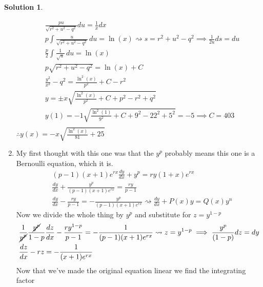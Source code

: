 \documentclass[10pt]{article}
\theoremstyle{definition}
\newtheorem{soln}{Solution}
\begin{document}
\begin{soln}
\begin{enumerate}[label=(\alph*)]
\begin{align*}
             & \frac{pu}{\sqrt{r^2+u^2-q^2}}du=\frac{1}{x}dx                                                           \\
             & p\int \frac{u}{\sqrt{r^2+u^2-q^2}} \, du=\ln(x)\rightsquigarrow s=r^2+u^2-q^2\implies \frac{1}{2u}ds=du \\
             & \frac{p}{2}\int \frac{1}{\sqrt{u}} \, du=\ln(x)                                                         \\
             & p\sqrt{r^2+u^2-q^2}=\ln(x)+C                                                                            \\
             & \frac{y^2}{x^2}-q^2=\frac{\ln^2(x)}{p^2}+C-r^2                                                          \\
             & y=\pm x\sqrt{\frac{\ln^2(x)}{p^2}+C+p^2-r^2+q^2}                                                        \\
             & y(1)=-1\sqrt{\frac{\ln^2(1)}{9^2}+C+9^2-22^2+5^2} = -5\implies C=403                                    \\
          \end{align*}
          $\therefore y(x)=-x\sqrt{\frac{\ln^2(x)}{81}+25}$
          \newpage
    \item My first thought with this one was that the $y^p$ probably means this one is a Bernoulli equation, which it is.
          \begin{align*}
             & (p-1)(x+1)e^{rx}\frac{dy}{dx}+y^p=ry(1+x)e^{rx}                                                                       \\
             & \frac{dy}{dx}+\frac{y^p}{(p-1)(x+1)e^{rx}}=\frac{ry}{p-1}                                                             \\
             & \frac{dy}{dx}-\frac{ry}{p-1}=-\frac{y^p}{(p-1)(x+1)e^{rx}} \rightsquigarrow\displaystyle \frac{dy}{dx}+P(x)y=Q(x)y^n
          \end{align*}
          Now we divide the whole thing by $y^p$ and substitute for $z=y^{1-p}$
          \begin{align*}
             & \frac{1}{\cancel{y^p}}\frac{\cancel{y^p}}{1-p}\frac{dz}{dx}-\frac{ry^{1-p}}{p-1}=-\frac{1}{(p-1)(x+1)e^{rx}} \rightsquigarrow z=y^{1-p}\implies \frac{y^p}{(1-p)}dz=dy \\
             & \frac{dz}{dx}-rz=-\frac{1}{(x+1)e^{rx}}
          \end{align*}
          Now that we've made the original equation linear we find the integrating factor

\end{enumerate}
\end{soln}
\end{document}

